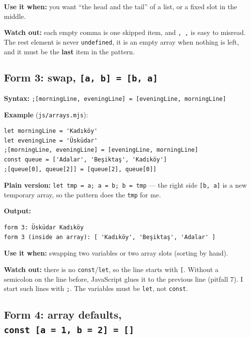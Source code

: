 \documentclass[
  10pt,
]{article}
\begin{document}
\textbf{Use it when:} you want ``the head and the tail'' of a list, or a
fixed slot in the middle.

\textbf{Watch out:} each empty comma is one skipped item, and
\texttt{,\ ,} is easy to misread. The rest element is never
\texttt{undefined}, it is an empty array when nothing is left, and it
must be the \textbf{last} item in the pattern.

\hypertarget{form-3-swap-a-b--b-a}{%
\subsection{\texorpdfstring{Form 3: swap,
\texttt{{[}a,\ b{]\allowbreak{}}\ =\ {[}b,\ a{]\allowbreak{}}}}{Form 3: swap, }}\label{form-3-swap-a-b--b-a}}

\textbf{Syntax:}
\texttt{;{[}morningLine,\ eveningLine{]\allowbreak{}}\ =\ {[}eveningLine,\ morningLine{]\allowbreak{}}}

\textbf{Example} (\texttt{js/\allowbreak{}arrays.\allowbreak{}mjs}):

\begin{verbatim}
let morningLine = 'Kadıköy'
let eveningLine = 'Üsküdar'
;[morningLine, eveningLine] = [eveningLine, morningLine]
const queue = ['Adalar', 'Beşiktaş', 'Kadıköy']
;[queue[0], queue[2]] = [queue[2], queue[0]]
\end{verbatim}

\textbf{Plain version:} \texttt{let\ tmp\ =\ a;\ a\ =\ b;\ b\ =\ tmp}
--- the right side \texttt{{[}b,\ a{]\allowbreak{}}} is a new temporary
array, so the pattern does the \texttt{tmp} for me.

\textbf{Output:}

\begin{verbatim}
form 3: Üsküdar Kadıköy
form 3 (inside an array): [ 'Kadıköy', 'Beşiktaş', 'Adalar' ]
\end{verbatim}

\textbf{Use it when:} swapping two variables or two array slots (sorting
by hand).

\textbf{Watch out:} there is no \texttt{const}/\texttt{let}, so the line
starts with \texttt{{[}}. Without a semicolon on the line before,
JavaScript glues it to the previous line (pitfall 7). I start such lines
with \texttt{;}. The variables must be \texttt{let}, not \texttt{const}.

\hypertarget{form-4-array-defaults-const-a--1-b--2--}{%
\subsection{\texorpdfstring{Form 4: array defaults,
\texttt{const\ {[}a\ =\ 1,\ b\ =\ 2{]\allowbreak{}}\ =\ {[}{]\allowbreak{}}}}{Form 4: array defaults, }}\label{form-4-array-defaults-const-a--1-b--2--}}
\end{document}
